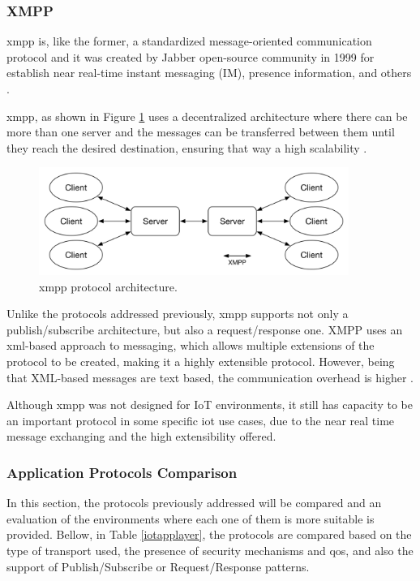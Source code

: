 \subsubsection{XMPP}

\acf{xmpp} is, like the former, a standardized message-oriented communication protocol and it was created by Jabber open-source community in 1999 for establish near real-time instant messaging (IM), presence information, and others \cite{Badugu}.

\ac{xmpp}, as shown in Figure \ref{fig:xmpp} uses a decentralized architecture where there can be more than one server and the messages can be transferred between them until they reach the desired destination, ensuring that way a high scalability \cite{Al-fuqaha2015}.

\begin{figure}[H]
	\centering
	\includegraphics[width=0.9\textwidth]{figures/xmpp.png}
	\caption{\ac{xmpp} protocol architecture.}
	\label{fig:xmpp}
\end{figure}

Unlike the protocols addressed previously, \ac{xmpp} supports not only a publish/subscribe architecture, but also a request/response one. XMPP uses an \acf{xml}-based approach to messaging, which allows multiple extensions of the protocol to be created, making it a highly extensible protocol. However, being that XML-based messages are text based, the communication overhead is higher \cite{Salman2013}. 

Although \ac{xmpp} was not designed for IoT environments, it still has capacity to be an important protocol in some specific \ac{iot} use cases, due to the near real time message exchanging and the high extensibility offered.

\subsubsection{Application Protocols Comparison}

In this section, the protocols previously addressed will be compared and an evaluation of the environments where each one of them is more suitable is provided. Bellow, in Table \ref{iotapplayer}, the protocols are compared based on the type of transport used, the presence of security mechanisms and \ac{qos}, and also the support of Publish/Subscribe or Request/Response patterns.

